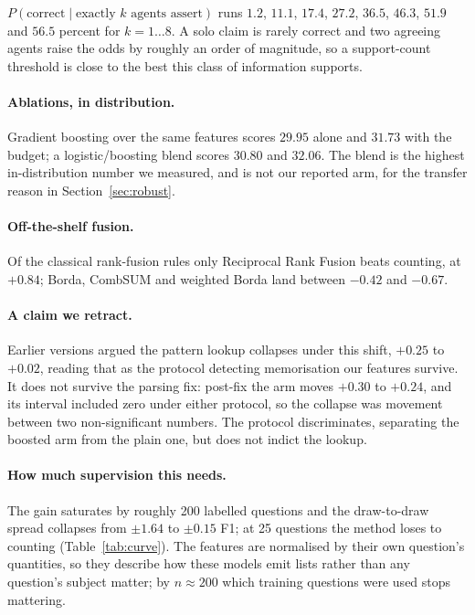 \documentclass{article}
\begin{document}
$P(\mathrm{correct} \mid \text{exactly } k \text{ agents assert})$ runs $1.2$, $11.1$, $17.4$, $27.2$, $36.5$, $46.3$, $51.9$ and $56.5$ percent for $k = 1 \dots 8$. %
A solo claim is rarely correct and two agreeing agents raise the odds by roughly an order of magnitude, so a support-count threshold is close to the best this class of information supports.

\paragraph{Ablations, in distribution.}
Gradient boosting over the same features scores $29.95$ alone and $31.73$ with the budget; a logistic/boosting blend scores $30.80$ and $32.06$. %
The blend is the highest in-distribution number we measured, and is not our reported arm, for the transfer reason in Section~\ref{sec:robust}.

\paragraph{Off-the-shelf fusion.}
Of the classical rank-fusion rules only Reciprocal Rank Fusion beats counting, at $+0.84$; Borda, CombSUM and weighted Borda land between $-0.42$ and $-0.67$. %

\paragraph{A claim we retract.}
Earlier versions argued the pattern lookup collapses under this shift, $+0.25$ to $+0.02$, reading that as the protocol detecting memorisation our features survive. It does not survive the parsing fix: post-fix the arm moves $+0.30$ to $+0.24$, and its interval included zero under either protocol, so the collapse was movement between two non-significant numbers. The protocol discriminates, separating the boosted arm from the plain one, but does not indict the lookup. %

\paragraph{How much supervision this needs.}
The gain saturates by roughly 200 labelled questions and the draw-to-draw spread collapses from $\pm 1.64$ to $\pm 0.15$ F1; at 25 questions the method loses to counting (Table~\ref{tab:curve}).
The features are normalised by their own question's quantities, so they describe how these models emit lists rather than any question's subject matter; by $n \approx 200$ which training questions were used stops mattering.
\end{document}
